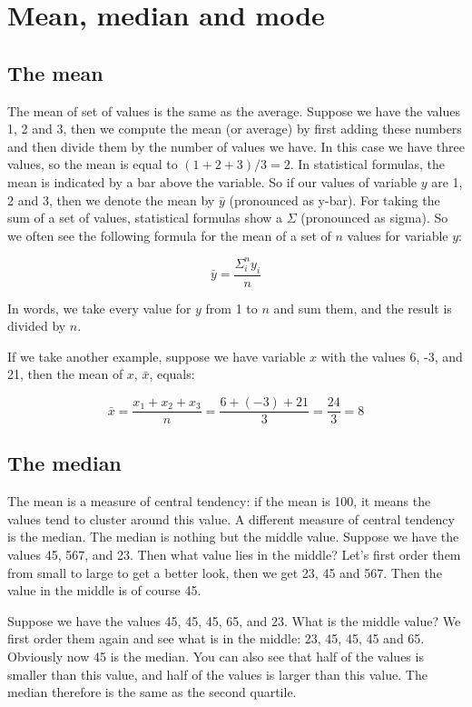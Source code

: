 \documentclass[]{report}\usepackage[]{graphicx}\usepackage[]{color}
\begin{document}
\section{Mean, median and mode}

\subsection{The mean}
The mean of set of values is the same as the average. Suppose we have the values 1, 2 and 3, then we compute the mean (or average) by first adding these numbers and then divide them by the number of values we have. In this case we have three values, so the mean is equal to $(1 + 2 + 3)/3 = 2$. In statistical formulas, the mean is indicated by a bar above the variable. So if our values of variable $y$ are 1, 2 and 3, then we denote the mean by $\bar{y}$ (pronounced as y-bar). For taking the sum of a set of values, statistical formulas show a $\Sigma$ (pronounced as sigma). So we often see the following formula for the mean of a set of $n$ values for variable $y$:

\begin{equation}
\bar{y} = \frac{\Sigma_i^n y_i}{n}
\end{equation}

In words, we take every value for $y$ from 1 to $n$ and sum them, and the result is divided by $n$.

If we take another example, suppose we have variable $x$ with the values {6, -3, and 21}, then the mean of $x$, $\bar{x}$, equals:

\begin{equation}
\bar{x} = \frac{x_1 + x_2 + x_3}{n} = \frac{6 + (-3) + 21}{3} = \frac{24}{3} = 8
\end{equation}



\subsection{The median}
The mean is a measure of central tendency: if the mean is 100, it means the values tend to cluster around this value. A different measure of central tendency is the median. The median is nothing but the middle value. Suppose we have the values 45, 567, and 23. Then what value lies in the middle? Let's first order them from small to large to get a better look, then we get 23, 45 and 567. Then the value in the middle is of course 45.

Suppose we have the values 45, 45, 45, 65, and 23. What is the middle value? We first order them again and see what is in the middle: 23, 45, 45, 45 and 65. Obviously now 45 is the median. You can also see that half of the values is smaller than this value, and half of the values is larger than this value. The median therefore is the same as the second quartile.
\end{document}
